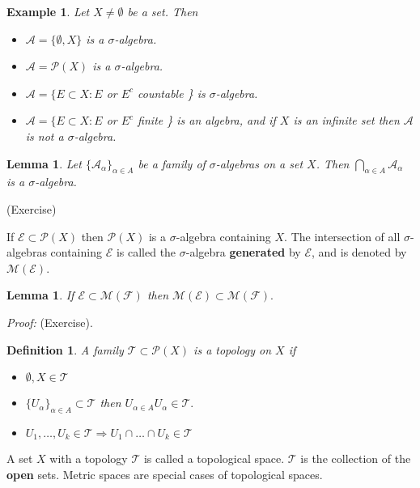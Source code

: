 \documentclass[12pt]{report}
\newtheorem{lemma}[theorem]{Lemma}
\newtheorem{definition}[theorem]{Definition}
\newtheorem{examp}{Example}[section]
\begin{document}
\begin{examp}  Let $X \ne \emptyset$ be a set.  Then

\begin{itemize}
\item[1.]  $\mathcal{A} = \{\emptyset, X\}$ is a $\sigma$-algebra.
\item[2.]  $\mathcal{A} =\mathcal{P}(X)$ is a $\sigma$-algebra.
\item[3.] $\mathcal{A} = \{E \subset X: E $ or $E^c$ countable \} is
$\sigma$-algebra.
\item[4.] $\mathcal{A} = \{E \subset X: E $ or $E^c$ finite \} is an algebra,
and if $X$ is an infinite set then $\mathcal{A}$ is not a $\sigma$-algebra.
\end{itemize}
\end{examp}


\begin{lemma}
Let $\{\mathcal{A}_\alpha\}_{\alpha \in A}$ be a family
of
$\sigma$-algebras on a set $X$.  Then 
$
\bigcap\limits_{\alpha \in A} \mathcal{A}_\alpha 
$
  is a $\sigma$-algebra.
\end{lemma}

\vspace{.15cm}
 (Exercise)

\vspace{.15cm} 
\noindent If $\mathcal{E} \subset \mathcal{P}(X)$ then $\mathcal{P}(X)$
is a $\sigma$-algebra containing $X$.  The intersection of all
$\sigma$-algebras containing $\mathcal{E}$ is called  the
$\sigma$-algebra {\bf generated} by $\mathcal{E}$, and is denoted by
$\mathcal{M}(\mathcal{E})$.

\begin{lemma}  If $\mathcal{E} \subset \mathcal{M} (\mathcal{F})$ then
$\mathcal{M} (\mathcal{E}) \subset \mathcal{M} (\mathcal{F}).$
\end{lemma} {\em Proof:} (Exercise).

\begin{definition}
 A family $\mathcal{T}\subset \mathcal{P}(X) $ is a topology on $X$  if
\begin{itemize}
\item[1.]  $\emptyset, X \in \mathcal{T}$
\item[2.]  $\{U_\alpha\}_{\alpha \in A} \subset \mathcal{T} $ then $
U_{\alpha \in A} U_\alpha \in \mathcal{T}.$
\item[3.] $U_1, \dots, U_k \in \mathcal{T}\Longrightarrow U_1 \cap
\dots \cap U_k\in\mathcal{T}$
\end{itemize}
\end{definition} A set $X$ with a topology $\mathcal{T}$ is called a
topological  space. $\mathcal{T}$ is the collection of the {\bf open}
sets.  Metric spaces are special cases of topological spaces.
\end{document}
